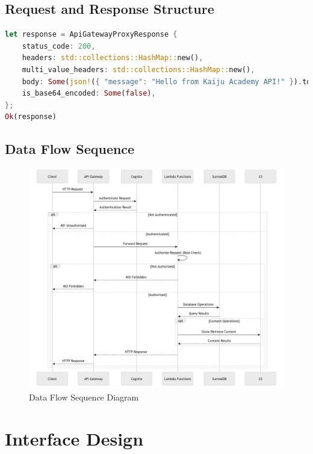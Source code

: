 \documentclass[a4paper, 11pt]{scrreprt}
\begin{document}
\section{Request and Response Structure}
\begin{lstlisting}[language=Rust]
let response = ApiGatewayProxyResponse {
    status_code: 200,
    headers: std::collections::HashMap::new(),
    multi_value_headers: std::collections::HashMap::new(),
    body: Some(json!({ "message": "Hello from Kaiju Academy API!" }).to_string()),
    is_base64_encoded: Some(false),
};
Ok(response)
\end{lstlisting}

\section{Data Flow Sequence}
\begin{figure}[ht]
    \centering
    \includegraphics[width=\textwidth]{data_flow.png}
    \caption{Data Flow Sequence Diagram}
\end{figure}

\chapter{Interface Design}
\end{document}
